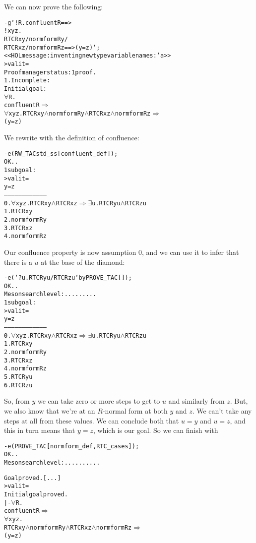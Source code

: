 We can now prove the following:
\begin{session}
\begin{alltt}
- g `!R. confluent R ==>
         !x y z.
           RTC R x y /\bs normform R y /\bs
           RTC R x z /\bs normform R z ==> (y = z)`;
<<HOL message: inventing new type variable names: 'a>>
> val it =
    Proof manager status: 1 proof.
    1. Incomplete:
         Initial goal:
         \(\forall\)R.
           confluent R \(\Rightarrow\)
           \(\forall\)x y z. RTC R x y \(\land\) normform R y \(\land\) RTC R x z \(\land\) normform R z \(\Rightarrow\)
                   (y = z)
\end{alltt}
\end{session}
We rewrite with the definition of confluence:
\begin{session}
\begin{alltt}
- e (RW_TAC std_ss [confluent_def]);
OK..
1 subgoal:
> val it =
    y = z
    ------------------------------------
      0.  \(\forall\)x y z. RTC R x y \(\land\) RTC R x z \(\Rightarrow\) \(\exists\)u. RTC R y u \(\land\) RTC R z u
      1.  RTC R x y
      2.  normform R y
      3.  RTC R x z
      4.  normform R z
\end{alltt}
\end{session}
    Our confluence property is now assumption 0, and we can use it to
    infer that there is a $u$ at the base of the diamond:
\begin{session}
\begin{alltt}
- e (`?u. RTC R y u /\bs RTC R z u` by PROVE_TAC []);
OK..
Meson search level: .........
1 subgoal:
> val it =
    y = z
    ------------------------------------
      0.  \(\forall\)x y z. RTC R x y \(\land\) RTC R x z \(\Rightarrow\) \(\exists\)u. RTC R y u \(\land\) RTC R z u
      1.  RTC R x y
      2.  normform R y
      3.  RTC R x z
      4.  normform R z
      5.  RTC R y u
      6.  RTC R z u
\end{alltt}
\end{session}
    So, from $y$ we can take zero or more steps to get to $u$ and
    similarly from $z$.  But, we also know that we're at an $R$-normal
    form at both $y$ and $z$.  We can't take any steps at all from
    these values.  We can conclude both that $u = y$ and $u = z$, and
    this in turn means that $y = z$, which is our goal.  So we can
    finish with
\begin{session}
\begin{alltt}
- e (PROVE_TAC [normform_def, RTC_cases]);
OK..
Meson search level: ..........

Goal proved. [...]
> val it =
    Initial goal proved.
    |- \(\forall\)R.
         confluent R \(\Rightarrow\)
         \(\forall\)x y z.
           RTC R x y \(\land\) normform R y \(\land\) RTC R x z \(\land\) normform R z \(\Rightarrow\)
           (y = z)
\end{alltt}
\end{session}
